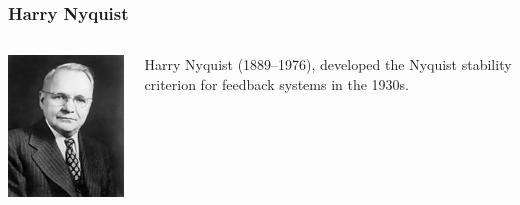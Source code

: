 \documentclass{beamer}
\begin{document}
\begin{frame}
\frametitle{Harry Nyquist}
\label{sec-2-7}
\begin{columns}
\begin{column}{0.3\textwidth}
\label{sec-2-7-1}

   \includegraphics[width=.9\linewidth]{image/Nyquist.jpg}
\end{column}
\begin{column}{0.7\textwidth}
\label{sec-2-7-2}


   Harry Nyquist (1889–1976), developed the Nyquist stability criterion for feedback systems in the 1930s.
\end{column}
\end{columns}
\end{frame}
\end{document}
